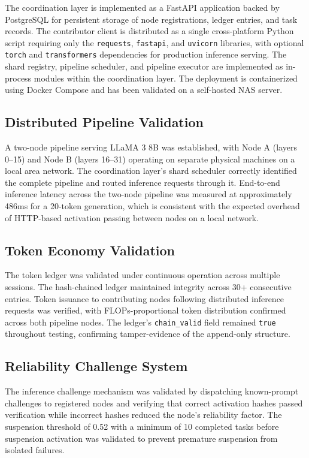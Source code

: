 \documentclass[12pt]{article}
\begin{document}
The coordination layer is implemented as a FastAPI application backed by PostgreSQL for persistent storage of node registrations, ledger entries, and task records. The contributor client is distributed as a single cross-platform Python script requiring only the \texttt{requests}, \texttt{fastapi}, and \texttt{uvicorn} libraries, with optional \texttt{torch} and \texttt{transformers} dependencies for production inference serving. The shard registry, pipeline scheduler, and pipeline executor are implemented as in-process modules within the coordination layer. The deployment is containerized using Docker Compose and has been validated on a self-hosted NAS server.

\subsection{Distributed Pipeline Validation}

A two-node pipeline serving LLaMA 3 8B was established, with Node A (layers 0--15) and Node B (layers 16--31) operating on separate physical machines on a local area network. The coordination layer's shard scheduler correctly identified the complete pipeline and routed inference requests through it. End-to-end inference latency across the two-node pipeline was measured at approximately 486ms for a 20-token generation, which is consistent with the expected overhead of HTTP-based activation passing between nodes on a local network.

\subsection{Token Economy Validation}

The token ledger was validated under continuous operation across multiple sessions. The hash-chained ledger maintained integrity across 30+ consecutive entries. Token issuance to contributing nodes following distributed inference requests was verified, with FLOPs-proportional token distribution confirmed across both pipeline nodes. The ledger's \texttt{chain\_valid} field remained \texttt{true} throughout testing, confirming tamper-evidence of the append-only structure.

\subsection{Reliability Challenge System}

The inference challenge mechanism was validated by dispatching known-prompt challenges to registered nodes and verifying that correct activation hashes passed verification while incorrect hashes reduced the node's reliability factor. The suspension threshold of 0.52 with a minimum of 10 completed tasks before suspension activation was validated to prevent premature suspension from isolated failures.
\end{document}
